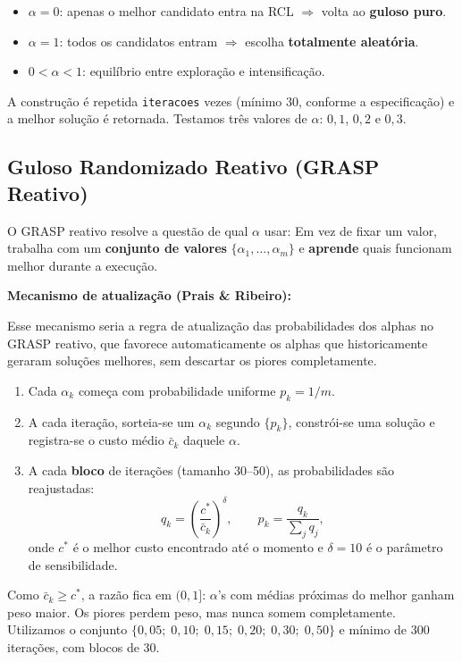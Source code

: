 \documentclass[12pt, a4paper]{article}
\begin{document}
\begin{itemize}
    \item $\alpha = 0$: apenas o melhor candidato entra na RCL $\Rightarrow$ volta ao \textbf{guloso puro}.
    \item $\alpha = 1$: todos os candidatos entram $\Rightarrow$ escolha \textbf{totalmente aleatória}.
    \item $0 < \alpha < 1$: equilíbrio entre exploração e intensificação.
\end{itemize}

A construção é repetida \texttt{iteracoes} vezes (mínimo 30, conforme a especificação) e a melhor solução é retornada. Testamos três valores de $\alpha$: $0{,}1$, $0{,}2$ e $0{,}3$.

\subsection{Guloso Randomizado Reativo (GRASP Reativo)}

O GRASP reativo \cite{prais2000} resolve a questão de qual $\alpha$ usar: Em vez de fixar um valor, trabalha com um \textbf{conjunto de valores} $\{\alpha_1, \ldots, \alpha_m\}$ e \textbf{aprende} quais funcionam melhor durante a execução.

\textbf{Mecanismo de atualização (Prais \& Ribeiro):}

 Esse mecanismo seria a regra de atualização das probabilidades dos alphas no GRASP reativo, que favorece automaticamente os alphas que historicamente geraram soluções melhores, sem descartar os piores completamente.
 
\begin{enumerate}
    \item Cada $\alpha_k$ começa com probabilidade uniforme $p_k = 1/m$.
    \item A cada iteração, sorteia-se um $\alpha_k$ segundo $\{p_k\}$, constrói-se uma solução e registra-se o custo médio $\bar{c}_k$ daquele $\alpha$.
    \item A cada \textbf{bloco} de iterações (tamanho 30--50), as probabilidades são reajustadas:
    \[
    q_k = \left(\frac{c^*}{\bar{c}_k}\right)^\delta, \qquad p_k = \frac{q_k}{\sum_j q_j},
    \]
    onde $c^*$ é o melhor custo encontrado até o momento e $\delta = 10$ é o parâmetro de sensibilidade.
\end{enumerate}

Como $\bar{c}_k \geq c^*$, a razão fica em $(0, 1]$: $\alpha$'s com médias próximas do melhor ganham peso maior. Os piores perdem peso, mas nunca somem completamente. Utilizamos o conjunto $\{0{,}05;\; 0{,}10;\; 0{,}15;\; 0{,}20;\; 0{,}30;\; 0{,}50\}$ e mínimo de 300 iterações, com blocos de 30.
\end{document}

